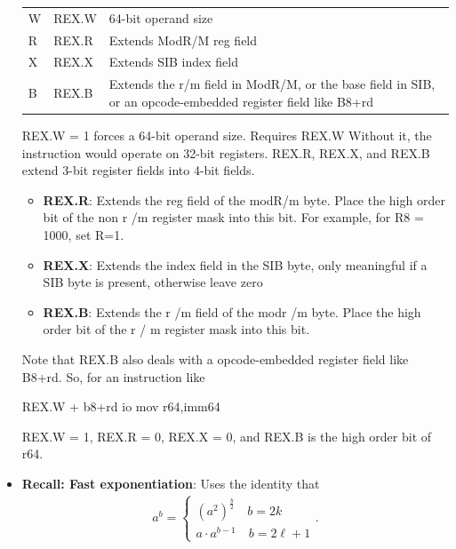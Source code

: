 \documentclass{report}
\begin{document}
\begin{itemize}
\begin{center}
\begin{tabularx}{\textwidth}{@{}XXX@{}}
                    \midrule
                    W	&REX.W	&64-bit operand size\\[2ex]
                    R	&REX.R	&Extends ModR/M reg field\\[2ex]
                    X	&REX.X	&Extends SIB index field\\[2ex]
                    B	&REX.B	&Extends the r/m field in ModR/M, or the base field in SIB, or an opcode-embedded register field like B8+rd \\
                    \bottomrule
                \end{tabularx}
            \end{center}
            REX.W = 1 forces a 64-bit operand size. Requires REX.W Without it, the instruction would operate on 32-bit registers.
            \bigbreak \noindent 
            REX.R, REX.X, and REX.B extend 3-bit register fields into 4-bit fields.
            \begin{itemize}
                \item \textbf{REX.R}: Extends the reg field of the modR/m byte. Place the high order bit of the non r /m register mask into this bit. For example, for R8 = 1000, set R=1.
                \item \textbf{REX.X}: Extends the index field in the SIB byte, only meaningful if a SIB byte is present, otherwise leave zero
                \item \textbf{REX.B}: Extends the r /m field of the modr /m byte. Place the high order bit of the r / m register mask into this bit.
            \end{itemize}
            Note that REX.B also deals with a opcode-embedded register field like B8+rd. So, for an instruction like
            \bigbreak \noindent 
            \begin{cppcode}
            REX.W + b8+rd io mov r64,imm64
            \end{cppcode}
            \bigbreak \noindent 
            REX.W = 1, REX.R = 0, REX.X = 0, and REX.B is the high order bit of r64.
        \item \textbf{Recall: Fast exponentiation}: Uses the identity that
            \begin{align*}
               a^{b} = \begin{cases}
                    (a^{2})^{\frac{b}{2}} \quad b = 2k \\
                    a\cdot a^{b-1} \quad b=2\ell  + 1
               \end{cases}
            .\end{align*}

\end{itemize}
\end{document}
